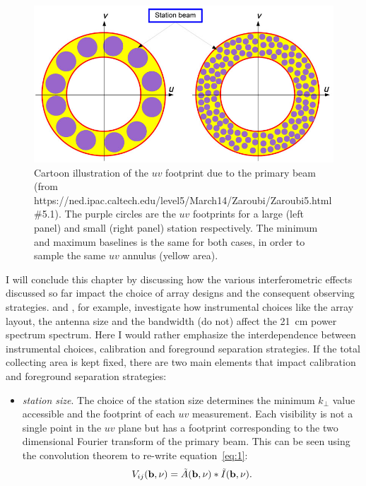 {\begin{figure}[]
\begin{center}
\includegraphics[width=1.\textwidth]{Bernardi/uv_footprint}
\end{center}
\caption{Cartoon illustration of the $uv$ footprint due to the primary beam (from https://ned.ipac.caltech.edu/level5/March14/Zaroubi/Zaroubi5.html\#5.1). The purple circles are the $uv$ footprints for a large (left panel) and small (right panel) station respectively. The minimum and maximum baselines is the same for both cases, in order to sample the same $uv$ annulus (yellow area).}
\label{fig:fig6}
\end{figure}
I will conclude this chapter by discussing how the various interferometric effects discussed so far impact the choice of array designs and the consequent observing strategies. \cite{morales05} and \cite{parsons12b}, for example, investigate how instrumental choices like the array layout, the antenna size and the bandwidth (do not) affect the 21~cm power spectrum spectrum. Here I would rather emphasize the interdependence between instrumental choices, calibration and foreground separation strategies. If the total collecting area is kept fixed, there are two main elements that impact calibration and foreground separation strategies:
\begin{itemize}
\item {\it station size}. The choice of the station size determines the minimum $k_\perp$ value accessible and the footprint of each $uv$ measurement. Each visibility is not a single point in the $uv$ plane but has a footprint corresponding to the two dimensional Fourier transform of the primary beam. This can be seen using the convolution theorem to re-write equation~\ref{eq:1}: \begin{equation}
V_{ij} ({\bf b}, \nu) = \tilde{A} ({\bf b}, \nu) \ast \tilde{I} ({\bf b}, \nu).

\end{equation}
\end{itemize}}
